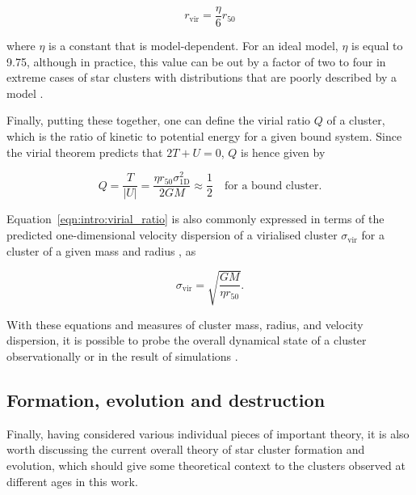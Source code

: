 \begin{equation}
	r_\text{vir} = \frac{\eta}{6} r_{50}
\end{equation}

\noindent
where $\eta$ is a constant that is model-dependent. For an ideal \cite{plummer_problem_1911} model, $\eta$ is equal to 9.75, although in practice, this value can be out by a factor of two to four in extreme cases of star clusters with distributions that are poorly described by a \cite{plummer_problem_1911} model \citep{portegies_zwart_young_2010}.

Finally, putting these together, one can define the virial ratio $Q$ of a cluster, which is the ratio of kinetic to potential energy for a given bound system. Since the virial theorem predicts that $2T + U = 0$, $Q$ is hence given by

\begin{equation}
	Q = \frac{T}{\left| U \right|}
	  = \frac{\eta r_{50} \sigma_\text{1D}^2}{2GM}
	  \approx \frac{1}{2} \quad \text{for a bound cluster.}
	\label{eqn:intro:virial_ratio}
\end{equation}

\noindent
Equation~\ref{eqn:intro:virial_ratio} is also commonly expressed in terms of the predicted one-dimensional velocity dispersion of a virialised cluster $\sigma_\text{vir}$ for a cluster of a given mass and radius \citep[e.g. in][]{bravi_gaia-eso_2018}, as

\begin{equation}
	\sigma_\text{vir} = \sqrt{\frac{GM}{\eta r_{50}}}.
	\label{eqn:intro:virial_velocity}
\end{equation}

With these equations and measures of cluster mass, radius, and velocity dispersion, it is possible to probe the overall dynamical state of a cluster observationally or in the result of simulations \citep{banerjee_how_2017,bravi_gaia-eso_2018,pang_3d_2021}.



\subsection{Formation, evolution and destruction}
\label{sec:intro:theory:evolution}

Finally, having considered various individual pieces of important theory, it is also worth discussing the current overall theory of star cluster formation and evolution, which should give some theoretical context to the clusters observed at different ages in this work.


